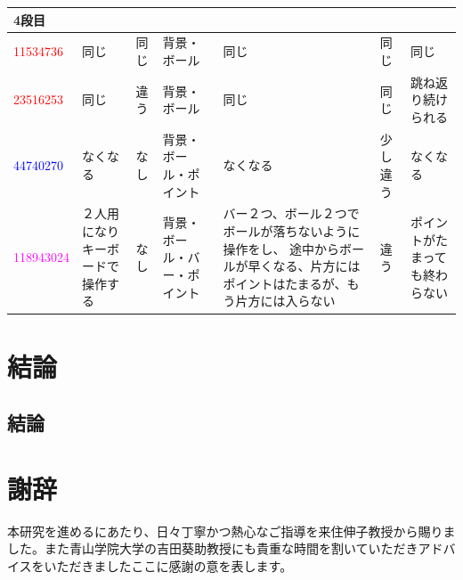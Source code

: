 \documentclass[a4paper,10pt,onecolumn,oneside,openany]{jsbook}
\begin{document}
\begin{table}[h]
\begin{center}
\begin{tabular}{|p{1.7cm}||p{1cm}|p{1cm}|p{1.7cm}|p{2cm}|p{1cm}|p{1.7cm}|}
4段目 &  &  &  &  &  &  \\ \hline
\textcolor{red}{11534736} & 同じ & 同じ & 背景・ボール & 同じ & 同じ & 同じ \\ \hline
\textcolor{red}{23516253} & 同じ & 違う & 背景・ボール & 同じ & 同じ & 跳ね返り続けられる \\ \hline
\textcolor{blue}{44740270} & なくなる & なし & 背景・ボール・ポイント & なくなる & 少し違う & なくなる \\ \hline
\textcolor{magenta}{118943024} & ２人用になりキーボードで操作する & なし & 背景・ボール・バー・ポイント & バー２つ、ボール２つでボールが落ちないように操作をし、 途中からボールが早くなる、片方にはポイントはたまるが、もう片方には入らない & 違う & ポイントがたまっても終わらない \\ \hline

\end{tabular}
\end{center}
\end{table}




\chapter{結論}
\section{結論}

%
\chapter{謝辞}
本研究を進めるにあたり、日々丁寧かつ熱心なご指導を来住伸子教授から賜りました。また青山学院大学の吉田葵助教授にも貴重な時間を割いていただきアドバイスをいただきましたここに感謝の意を表します。
%
%
\end{document}
